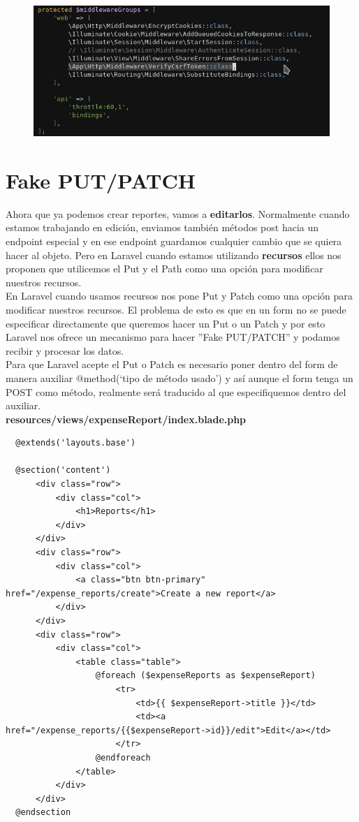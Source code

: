 \documentclass{article}
\begin{document}
\begin{figure}[h!]
  \centering
  \includegraphics[scale=0.5]{./Pictures/068_middlewareGroups.png}
\end{figure}


\section{Fake PUT/PATCH}%
Ahora que ya podemos crear reportes, vamos a \textbf{editarlos}. Normalmente
cuando estamos trabajando en edición, enviamos también métodos post hacia un
endpoint especial y en ese endpoint guardamos cualquier cambio que se quiera
hacer al objeto. Pero en Laravel cuando estamos utilizando \textbf{recursos}
ellos nos proponen que utilicemos el Put y el Path como una opción para
modificar nuestros recursos.\\

En Laravel cuando usamos recursos nos pone Put y Patch como una opción para
modificar nuestros recursos. El problema de esto es que en un form no se puede
especificar directamente que queremos hacer un Put o un Patch y por esto
Laravel nos ofrece un mecanismo para hacer ”Fake PUT/PATCH” y podamos recibir y
procesar los datos.\\

Para que Laravel acepte el Put o Patch es necesario poner dentro del form de
manera auxiliar @method(‘tipo de método usado’) y así aunque el form tenga un
POST como método, realmente será traducido al que especifiquemos dentro del
auxiliar.\\

\textbf{resources/views/expenseReport/index.blade.php}
\begin{verbatim}
  @extends('layouts.base')

  @section('content')
      <div class="row">
          <div class="col">
              <h1>Reports</h1>
          </div>
      </div>
      <div class="row">
          <div class="col">
              <a class="btn btn-primary" href="/expense_reports/create">Create a new report</a>
          </div>
      </div>
      <div class="row">
          <div class="col">
              <table class="table">
                  @foreach ($expenseReports as $expenseReport)
                      <tr>
                          <td>{{ $expenseReport->title }}</td>
                          <td><a href="/expense_reports/{{$expenseReport->id}}/edit">Edit</a></td>
                      </tr>
                  @endforeach
              </table>
          </div>
      </div>
  @endsection
\end{verbatim}
\end{document}
